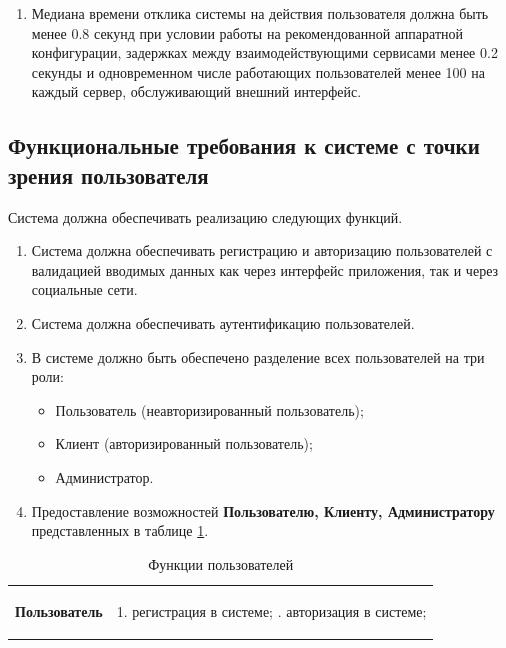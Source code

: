 \documentclass[a4paper, 12pt]{article}
\begin{document}
\begin{large}
\begin{enumerate}
	\item Медиана времени отклика системы на действия пользователя должна быть менее 0.8 секунд при условии работы на рекомендованной аппаратной конфигурации, задержках между взаимодействующими сервисами менее 0.2 секунды и одновременном числе работающих пользователей менее 100 на каждый сервер, обслуживающий внешний интерфейс.
\end{enumerate}

\subsection{Функциональные требования к системе с точки зрения пользователя}
Система должна обеспечивать реализацию следующих функций.
\begin{enumerate}
	\item Система должна обеспечивать регистрацию и авторизацию пользователей с валидацией вводимых данных как через интерфейс приложения, так и через социальные сети.
	
	\item Система должна обеспечивать аутентификацию пользователей.
	
	\item В системе должно быть обеспечено разделение всех пользователей на три роли:
	\begin{itemize}
		\item Пользователь (неавторизированный пользователь);
		
		\item Клиент (авторизированный пользователь);
		
		\item Администратор.
	\end{itemize}
	
	\item Предоставление возможностей \textbf{Пользователю, Клиенту, Администратору} представленных в таблице \ref{tbl:user-func}.
\end{enumerate}


\begin{longtable}{|p{0.5cm}|p{15.5cm}|}
    \captionsetup{singlelinecheck=false, justification=raggedleft}
	\caption{Функции пользователей}
	\label{tbl:user-func} \\
	\hline
	
	\begin{rotatebox}[origin=r]{90}
		{ \textbf{Пользователь}}
	\end{rotatebox} 
	& 
	1. регистрация в системе; \newline
	2. авторизация в системе; \\
	\hline
	

\end{longtable}
\end{large}
\end{document}
